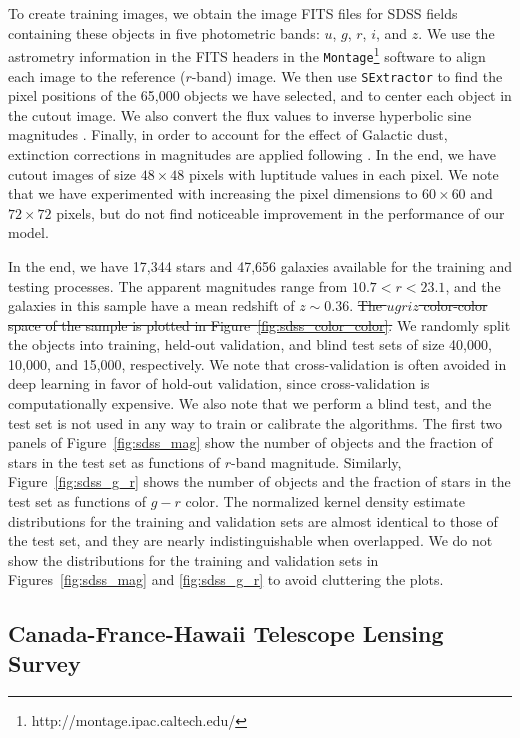 \documentclass[fleqn,usenatbib]{mnras}
\begin{document}
To create training images,
we obtain the image FITS files for SDSS fields containing these objects
in five photometric bands: $u$, $g$, $r$, $i$, and $z$.
We use the astrometry information in the FITS headers
in the \texttt{Montage}\footnote{http://montage.ipac.caltech.edu/} software
to align each image to the reference ($r$-band) image.
We then use \texttt{SExtractor} to find the pixel positions of
the 65,000 objects we have selected,
and to center each object in the cutout image.
We also convert the flux values to inverse hyperbolic sine magnitudes
\citep[also known as luptitudes;][]{lupton1999modified}.
Finally, in order to account for the effect of Galactic dust,
extinction corrections in magnitudes are applied
following \cite{schlegel1998maps}.
In the end, we have cutout images of size $48\times48$ pixels
with luptitude values in each pixel.
We note that we have experimented with increasing the pixel dimensions to
$60\times60$ and $72\times72$ pixels, but do not find noticeable
improvement in the performance of our model.

In the end, we have 17,344 stars and 47,656 galaxies available
for the training and testing processes.
The apparent magnitudes range from $10.7 < r < 23.1$,
and the galaxies in this sample have a mean redshift of $z \sim 0.36$.
\sout{
The $ugriz$ color-color space of the sample is plotted in
Figure~\ref{fig:sdss_color_color}.
}
We randomly split the objects into training, held-out validation,
and blind test sets of size 40,000, 10,000, and 15,000, respectively.
We note that cross-validation is often avoided in deep learning
in favor of hold-out validation,
since cross-validation is computationally expensive.
We also note that we perform a blind test, and the test set is not used in any
way to train or calibrate the algorithms.
The first two panels of Figure~\ref{fig:sdss_mag} show the number of objects
and the fraction of stars in the test set as functions of $r$-band magnitude.
Similarly, Figure~\ref{fig:sdss_g_r} shows the number of objects and the
fraction of stars in the test set as functions of $g-r$ color.
The normalized kernel density estimate distributions for the training
and validation sets are almost identical to those of the test set,
and they are nearly indistinguishable when overlapped.
We do not show the distributions for the training and validation sets in
Figures~\ref{fig:sdss_mag} and \ref{fig:sdss_g_r} to avoid cluttering the
plots.


\subsection{Canada-France-Hawaii Telescope Lensing Survey}
\end{document}
